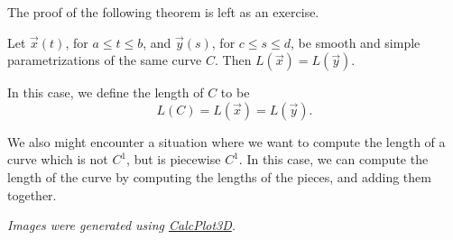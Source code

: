 \documentclass{ximera}
\begin{document}
The proof of the following theorem is left as an exercise. 

\begin{theorem}
Let $\vec{x}(t)$, for $a\leq t\leq b$, and $\vec{y}(s)$, for $c\leq s\leq d$, be smooth and simple parametrizations of the same curve $C$. Then $L(\vec{x}) = L(\vec{y})$.

In this case, we define the length of $C$ to be
\[
L(C) = L(\vec{x}) = L(\vec{y}).
\]
\end{theorem}

We also might encounter a situation where we want to compute the length of a curve which is not $C^1$, but is piecewise $C^1$. In this case, we can compute the length of the curve by computing the lengths of the pieces, and adding them together.

\begin{image}
\end{image}

\textit{Images were generated using \href{https://www.monroecc.edu/faculty/paulseeburger/calcnsf/CalcPlot3D/}{CalcPlot3D}.}
\end{document}
